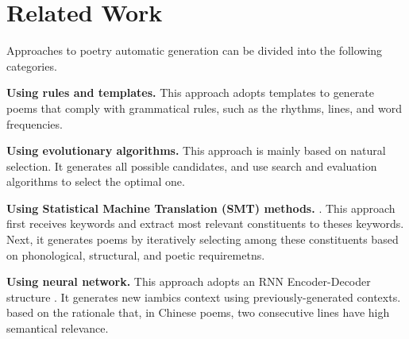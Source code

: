 \section{Related Work}  
Approaches to poetry automatic generation can be divided into the following categories.

\textbf{Using rules and templates.}
%
This approach adopts templates to generate poems that comply with grammatical rules, such as the rhythms, lines, and word frequencies\cite{wu2009new,tosa2008hitch}. 

\textbf {Using evolutionary algorithms.} This approach is mainly based on natural selection. It generates all possible candidates, and use search and evaluation algorithms to select the optimal one\cite{manurung2004evolutionary,manurung2012using}.
%

\textbf{Using Statistical Machine Translation (SMT) methods.}
\cite{jiang2008generating}. This approach first receives keywords and extract most relevant constituents to theses keywords.  Next, it generates poems by iteratively selecting among these constituents based on phonological,
structural, and poetic requiremetns.

\textbf{Using neural network.}  This approach adopts an RNN Encoder-Decoder structure \cite{wang2016chinese,bahdanau2014neural}. 
%
It generates new iambics context using previously-generated contexts. based on the rationale  that, in Chinese poems, two consecutive lines have high semantical relevance.
  